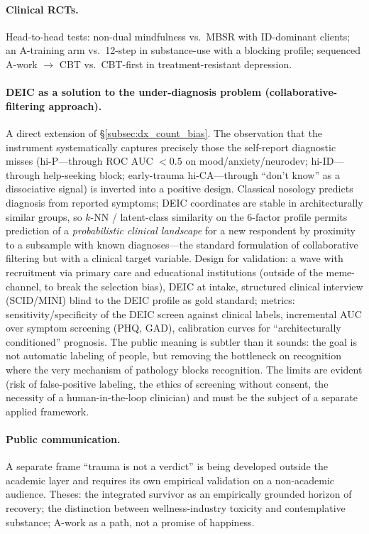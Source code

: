 \paragraph{Clinical RCTs.} Head-to-head tests: non-dual mindfulness vs.\ MBSR with ID-dominant clients; an A-training arm vs.\ 12-step in substance-use with a blocking profile; sequenced A-work $\to$ CBT vs.\ CBT-first in treatment-resistant depression.

\paragraph{DEIC as a solution to the under-diagnosis problem (collaborative-filtering approach).} A direct extension of §\ref{subsec:dx_count_bias}. The observation that the instrument systematically captures precisely those the self-report diagnostic misses (hi-P---through ROC AUC $< 0.5$ on mood/anxiety/neurodev; hi-ID---through help-seeking block; early-trauma hi-CA---through ``don't know'' as a dissociative signal) is inverted into a positive design. Classical nosology predicts diagnosis from reported symptoms; DEIC coordinates are stable in architecturally similar groups, so $k$-NN / latent-class similarity on the 6-factor profile permits prediction of a \emph{probabilistic clinical landscape} for a new respondent by proximity to a subsample with known diagnoses---the standard formulation of collaborative filtering but with a clinical target variable. Design for validation: a wave with recruitment via primary care and educational institutions (outside of the meme-channel, to break the selection bias), DEIC at intake, structured clinical interview (SCID/MINI) blind to the DEIC profile as gold standard; metrics: sensitivity/specificity of the DEIC screen against clinical labels, incremental AUC over symptom screening (PHQ, GAD), calibration curves for ``architecturally conditioned'' prognosis. The public meaning is subtler than it sounds: the goal is not automatic labeling of people, but removing the bottleneck on recognition where the very mechanism of pathology blocks recognition. The limits are evident (risk of false-positive labeling, the ethics of screening without consent, the necessity of a human-in-the-loop clinician) and must be the subject of a separate applied framework.

\paragraph{Public communication.} A separate frame ``trauma is not a verdict'' is being developed outside the academic layer and requires its own empirical validation on a non-academic audience. Theses: the integrated survivor as an empirically grounded horizon of recovery; the distinction between wellness-industry toxicity and contemplative substance; A-work as a path, not a promise of happiness.

